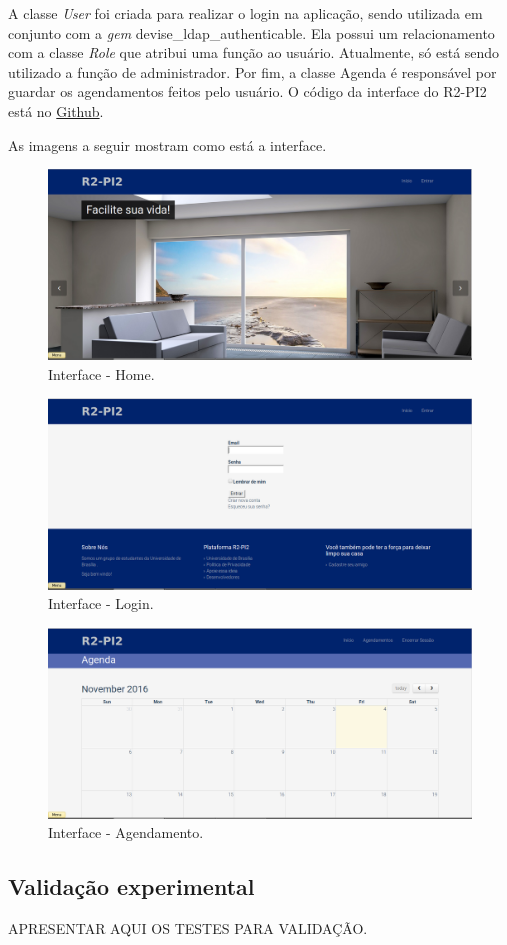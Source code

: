A classe \textit{User} foi criada para realizar o login na aplicação, sendo utilizada em conjunto com a \textit{gem} devise\_ldap\_authenticable. Ela possui um relacionamento com a classe \textit{Role} que atribui uma função ao usuário. Atualmente, só está sendo utilizado a função de administrador. Por fim, a classe Agenda é responsável por guardar os agendamentos feitos pelo usuário. O código da interface do R2-PI2 está no \href{https://github.com/PI2Aspirador/railsApp}{Github}.

As imagens a seguir mostram como está a interface.

\begin{figure}[H]
	\centering
	\includegraphics[scale=0.3]{figuras/home_interface.png}
	\caption{Interface - Home.}
	\label{img:home}
\end{figure}

\begin{figure}[H]
	\centering
	\includegraphics[scale=0.3]{figuras/login.png}
	\caption{Interface - Login.}
	\label{img:login}
\end{figure}

\begin{figure}[H]
	\centering
	\includegraphics[scale=0.3]{figuras/agendamento.png}
	\caption{Interface - Agendamento.}
	\label{img:agendamento}
\end{figure}


\subsection{Validação experimental} %
	\label{sub:validação_experimental}

	APRESENTAR AQUI OS TESTES PARA VALIDAÇÃO.